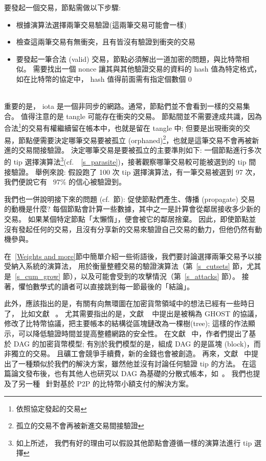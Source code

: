\documentclass[12pt]{article}
\begin{document}
\begin{CJK}{UTF8}{bkai}
要發起一個交易，節點需做以下步驟:
\begin{itemize}
  \item 
  根據演算法選擇兩筆交易驗證(這兩筆交易可能會一樣)
  \item 
  檢查這兩筆交易有無衝突，且有皆沒有驗證到衝突的交易
  \item
  要發起一筆合法 (valid) 交易，節點必須解出一道加密的問題，與比特幣相似。
  需要找出一個 nonce 讓其與其他驗證交易的資料的 hash 值為特定格式，如在比特幣的協定中， hash 值得前面需有指定個數個 0
\end{itemize} \leavevmode\\
重要的是， iota 是一個非同步的網路。通常，節點們並不會看到一樣的交易集合。
值得注意的是 tangle 可能存在衝突的交易。
節點間並不需要達成共識，因為合法\footnote{依照協定發起的交易}的交易有權繼續留在帳本中，也就是留在 tangle 中; 
但要是出現衝突的交易，節點便需要決定哪筆交易要被孤立 (orphaned)\footnote{孤立的交易不會再被新進交易間接驗證}，也就是這筆交易不會再被新進的交易間接驗證。
決定哪筆交易是要被孤立的主要準則如下: 一個節點進行多次的 tip 選擇演算法\footnote{如上所述，
我們有好的理由可以假設其他節點會遵循一樣的演算法進行 tip 選擇}(cf.\ ~\ref{s_parasite})，接著觀察哪筆交易較可能被選到的 tip 間接驗證。
舉例來說: 假設跑了 100 次 tip 選擇演算法，有一筆交易被選到 97 次，我們便說它有 ~$97\%$ 的信心被驗證到。 

我們也一併說明接下來的問題 (cf.\ \cite{red_balloons}節): 
促使節點們產生、傳播 (propagate) 交易的動機是什麼? 
每個節點會計算一些數據，其中之一是計算會從鄰居接收多少新的交易。
如果某個特定節點「太懶惰」，便會被它的鄰居捨棄。
因此，即使節點並沒有發起任何的交易，且沒有分享新的交易來驗證自己交易的動力，但他仍然有動機參與。 

在~\ref{Weights and more}節中簡單介紹一些術語後，我們要討論選擇兩筆交易予以接受納入系統的演算法，
用於衡量整體交易的驗證演算法（第~\ref{s_cutsets} 節，尤其是~\ref{s_cum_grow} 節），以及可能會受到的攻擊情況（第~\ref{s_attacks} 節）。 
接著，懼怕數學式的讀者可以直接跳到每一節最後的「結論」。

此外，應該指出的是，有關有向無環圖在加密貨幣領域中的想法已經有一些時日了，
比如文獻 ~\cite{dag_generalized_blockchain, dagcoin, SZ, LSZ, braids}。
尤其需要指出的是，文獻 ~\cite{SZ} 中提出是被稱為 GHOST 的協議，修改了比特幣協議，把主要帳本的結構從區塊鏈改為一棵樹(tree); 
這樣的作法顯示，可以降低驗證時間並提高整體網路的安全性。
在文獻~\cite{LSZ} 中，作者們提出了基於 DAG 的加密貨幣模型; 
有別於我們模型的是，組成 DAG 的是區塊 (block)，而非獨立的交易。
且礦工會競爭手續費，新的金錢也會被創造。
再來，文獻~\cite{dagcoin} 中提出了一種類似於我們的解決方案，雖然他並沒有討論任何驗證 tip 的方法。
在這篇論文發布後，也有其他人也研究以 DAG 為基礎的分散式帳本，如~\cite{SZ_SPECTRE}。
我們也提及了另一種~\cite{bitcoinj,lightning} 針對基於 P2P 的比特幣小額支付的解決方案。


\end{CJK}
\end{document}
